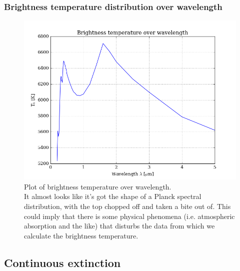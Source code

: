 \documentclass[11pt,a4paper,notitlepage]{article}
\begin{document}
\subsubsection{Brightness temperature distribution over wavelength}
\begin{figure}[H]
\center

	\includegraphics[scale=0.42]{../figs/2obs_Tb.png}
	\caption{Plot of brightness temperature over wavelength.\\
	It almost looks like it's got the shape of a Planck spectral distribution, with the top chopped off and taken a bite out of. This could imply that there is some physical phenomena (i.e. atmospheric absorption and the like) that disturbs the data from which we calculate the brightness temperature.}
\end{figure}

\subsection{Continuous extinction}
\end{document}
